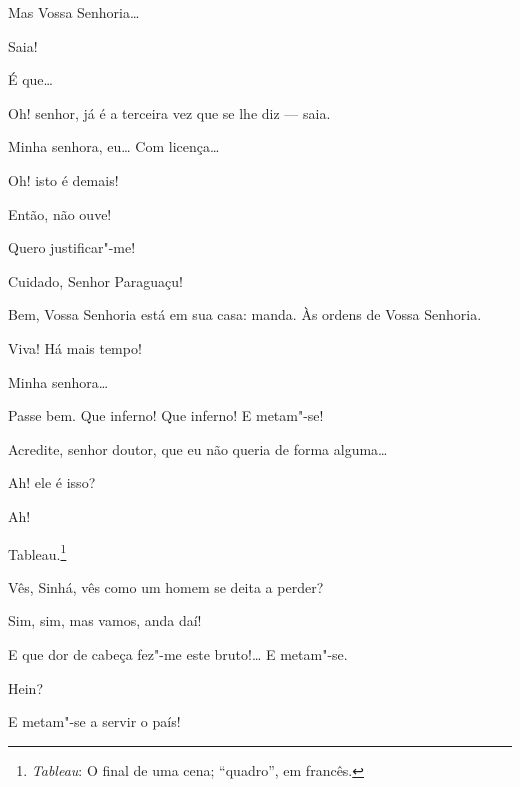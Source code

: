 \begin{linenumbers}
 Mas Vossa Senhoria\ldots{}

 Saia!

 É que\ldots{}

 Oh! senhor, já é a terceira vez que se lhe diz --- saia.

 Minha senhora, eu\ldots{}  Com licença\ldots{}

 Oh! isto é demais!

 Então, não ouve!

 Quero justificar"-me!

  Cuidado, Senhor Paraguaçu!

 Bem, Vossa Senhoria está em sua casa: manda.
 Às ordens
de Vossa Senhoria.

 Viva! Há mais tempo! 

 Minha senhora\ldots{}

 Passe bem.  Que inferno!
Que inferno! E metam"-se!

  Acredite, senhor doutor, que eu não
queria de forma alguma\ldots{}

  Ah! ele é isso? 

  Ah! 

  Tableau.\footnote{ \textit{Tableau}: O final de uma cena;
``quadro'', em francês.}




 Vês, Sinhá, vês como um homem se deita a perder?

 Sim, sim, mas vamos, anda daí!

  E que dor
de cabeça fez"-me este bruto!\ldots{} E metam"-se.

 Hein?

 E metam"-se a servir o país!


\end{linenumbers}

